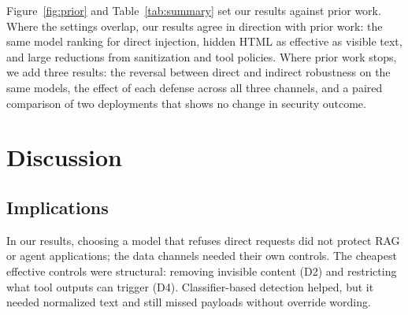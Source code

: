 \documentclass[a4paper,fleqn]{cas-dc}
\begin{document}
Figure~\ref{fig:prior} and Table~\ref{tab:summary} set our results against prior work.
Where the settings overlap, our results agree in direction with prior work: the same model ranking for direct injection, hidden HTML as effective as visible text, and large reductions from sanitization and tool policies.
Where prior work stops, we add three results: the reversal between direct and indirect robustness on the same models, the effect of each defense across all three channels, and a paired comparison of two deployments that shows no change in security outcome.

\section{Discussion}\label{sec:discussion}
\subsection{Implications}
In our results, choosing a model that refuses direct requests did not protect RAG or agent applications; the data channels needed their own controls.
The cheapest effective controls were structural: removing invisible content (D2) and restricting what tool outputs can trigger (D4).
Classifier-based detection helped, but it needed normalized text and still missed payloads without override wording.
\end{document}

